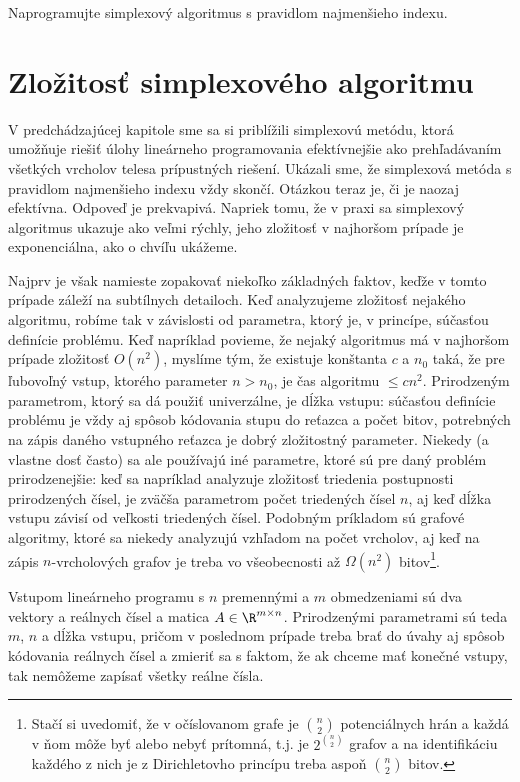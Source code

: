 \begin{prob}
  Naprogramujte simplexový algoritmus s pravidlom najmenšieho indexu.
\end{prob}

\section{Zložitosť simplexového algoritmu}

\noindent
V predchádzajúcej kapitole sme sa si priblížili simplexovú metódu, ktorá umožňuje 
riešiť úlohy lineárneho programovania efektívnejšie ako prehľadávaním všetkých vrcholov telesa prípustných riešení.
Ukázali sme, že simplexová metóda s pravidlom najmenšieho indexu vždy skončí. Otázkou teraz je, či je
naozaj efektívna. Odpoveď je prekvapivá. Napriek tomu, že v praxi sa simplexový algoritmus ukazuje 
ako veľmi rýchly, jeho zložitosť v najhoršom prípade je exponenciálna, ako o chvíľu ukážeme.

\noindent
Najprv je však namieste zopakovať niekoľko základných faktov, keďže v tomto prípade záleží na subtílnych 
detailoch. Keď analyzujeme zložitosť nejakého algoritmu, 
robíme tak v závislosti od  parametra, ktorý je, v princípe,
súčasťou definície problému. Keď napríklad povieme, že nejaký algoritmus má v najhoršom 
prípade zložitosť $O(n^2)$, myslíme tým,
že existuje konštanta $c$ a $n_0$ taká, že pre ľubovoľný vstup, ktorého parameter $n>n_0$, je čas
algoritmu $\le cn^2$. Prirodzeným parametrom, ktorý sa dá použiť univerzálne, je dĺžka vstupu: súčasťou
definície problému je vždy aj spôsob kódovania stupu do reťazca a počet bitov, potrebných na zápis 
daného vstupného reťazca je dobrý zložitostný parameter. Niekedy (a vlastne dosť často) sa ale používajú
iné parametre, ktoré sú pre daný problém prirodzenejšie: keď sa napríklad analyzuje zložitosť triedenia
postupnosti prirodzených čísel, je zväčša parametrom počet triedených čísel $n$, aj keď dĺžka vstupu závisí od 
veľkosti triedených čísel. Podobným príkladom sú grafové algoritmy, ktoré sa niekedy analyzujú vzhľadom na
počet vrcholov, aj keď na zápis $n$-vrcholových grafov je treba vo všeobecnosti až $\Omega(n^2)$ 
bitov\footnote{Stačí si uvedomiť, že v očíslovanom grafe je ${n\choose 2}$ potenciálnych hrán
  a každá v ňom môže byť alebo nebyť prítomná, t.j. je $2^{n\choose 2}$ grafov a na identifikáciu 
každého z nich je z Dirichletovho princípu treba aspoň $n\choose 2$ bitov.}.

\noindent
Vstupom lineárneho programu s $n$ premennými a $m$ obmedzeniami sú dva vektory  a  reálnych čísel
a matica $A\in\R^{m\times n}$. Prirodzenými parametrami sú teda $m$, $n$ a dĺžka vstupu, pričom v poslednom
prípade treba brať do úvahy aj spôsob kódovania reálnych čísel a zmieriť sa s faktom, že ak chceme mať konečné vstupy,
tak nemôžeme zapísať všetky reálne čísla. 

